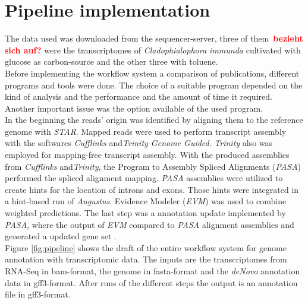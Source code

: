 \documentclass[12pt, a4paper]{report}
\newcommand{\HT}[1]{\textcolor{red}\textbf{#1}}
\begin{document}
\section{Pipeline implementation}
The data used was downloaded from the sequencer-server, three of them~\HT{bezieht sich auf?} were the transcriptomes of \textit{Cladophialophora immunda} cultivated with glucose as carbon-source and the other three with toluene. \\
Before implementing the workflow system a comparison of publications, different programs and tools were done. The choice of a suitable program depended on the kind of analysis and the performance and the amount of time it required. Another important issue was the option available of the used program. \\
In the beginning the reads' origin was identified by aligning them to the reference genome with \textit{STAR}. Mapped reads were used to perform transcript assembly with the softwares \textit{Cufflinks} and\textit{Trinity Genome Guided}. \textit{Trinity} also was employed for mapping-free transcript assembly. With the produced assemblies from \textit{Cufflinks} and\textit{Trinity}, the Program to Assembly Spliced Alignments (\textit{PASA}) performed the spliced alignment mapping. \textit{PASA} assemblies were utilized to create hints for the location of introns and exons. Those hints were integrated in a hint-based run of \textit{Augustus}. Evidence Modeler (\textit{EVM}) was used to combine weighted predictions. The last step was a annotation update implemented by \textit{PASA}, where the output of \textit{EVM} compared to \textit{PASA} alignment assemblies and generated a updated gene set \cite{Haas2011, Steijger2013, Linde2015}.  \\
Figure \ref{fig:pipeline} shows the draft of the entire workflow system for genome annotation with transcriptomic data. The inputs are the transcriptomes from RNA-Seq in bam-format, the genome in fasta-format and the \textit{deNovo} annotation data in gff3-format. After runs of the different steps the output is an annotation file in gff3-format.
\end{document}
